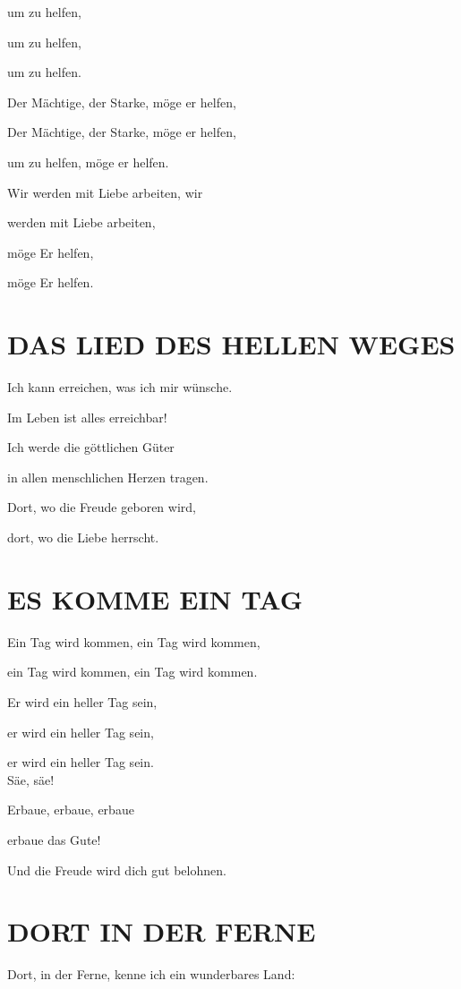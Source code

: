 \documentclass[11pt,a5paper,twoside]{article}
\begin{document}
um zu helfen,

um zu helfen,

um zu helfen.

Der Mächtige, der Starke, möge er helfen,

Der Mächtige, der Starke, möge er helfen,

um zu helfen, möge er helfen.

Wir werden mit Liebe arbeiten, wir

werden mit Liebe arbeiten,

möge Er helfen,

möge Er helfen.

\section[Das Lied des hellen Weges]{DAS LIED DES HELLEN WEGES}

Ich kann erreichen, was ich mir wünsche. 

Im Leben ist alles erreichbar!

Ich werde die göttlichen Güter 

in allen menschlichen Herzen tragen.

Dort, wo die Freude geboren wird, 

dort, wo die Liebe herrscht.

\section[Es komme ein Tag]{ES KOMME EIN TAG}

Ein Tag wird kommen, ein Tag wird kommen,

ein Tag wird kommen, ein Tag wird kommen.

Er wird ein heller Tag sein,

er wird ein heller Tag sein,

er wird ein heller Tag sein.\\

Säe, säe!

Erbaue, erbaue, erbaue 

erbaue das Gute!

Und die Freude wird dich gut belohnen.

\section[Dort in der Ferne]{DORT IN DER FERNE}

Dort, in der Ferne, kenne ich ein wunderbares Land:
\end{document}
